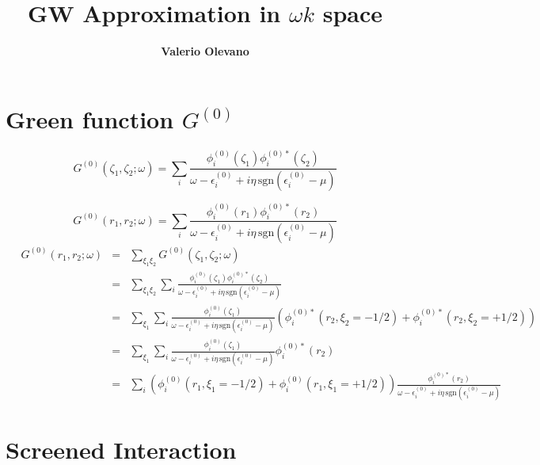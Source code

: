 \documentclass[fleqn]{article}
\title{\bf GW Approximation in $\omega k$ space}
\author{\bf Valerio Olevano}
\begin{document}
\maketitle
\tableofcontents

\newpage

\section{Green function $G^{(0)}$}

\[
  G^{(0)}(\zeta_1,\zeta_2;\omega) = 
  \sum_i \frac{\phi^{(0)}_i(\zeta_1) \phi^{(0)*}_i(\zeta_2)}
  {\omega - \epsilon^{(0)}_i + i \eta \mathrm{\, sgn} \left( \epsilon^{(0)}_i - \mu \right)}
\]

\[
  G^{(0)}(r_1,r_2;\omega) = 
  \sum_i \frac{\phi^{(0)}_i(r_1) \phi^{(0)*}_i(r_2)}
  {\omega - \epsilon^{(0)}_i + i \eta \mathrm{\, sgn} \left( \epsilon^{(0)}_i - \mu \right)}
\]
\begin{eqnarray*}
  \quad
  G^{(0)}(r_1,r_2;\omega) &=&
  \sum_{\xi_1 \xi_2} G^{(0)}(\zeta_1,\zeta_2;\omega) 
  \\ &=& 
  \sum_{\xi_1 \xi_2}    \sum_i \frac{\phi^{(0)}_i(\zeta_1) \phi^{(0)*}_i(\zeta_2)}
  {\omega - \epsilon^{(0)}_i + i \eta \mathrm{\, sgn} \left( \epsilon^{(0)}_i - \mu \right)}
  \\
  &=& \sum_{\xi_1}  \sum_i \frac{\phi^{(0)}_i(\zeta_1)}
  {\omega - \epsilon^{(0)}_i + i \eta \mathrm{\, sgn} \left( \epsilon^{(0)}_i - \mu \right)}
  \left( \phi^{(0)*}_i(r_2,\xi_2=-1/2) + \phi^{(0)*}_i(r_2,\xi_2=+1/2) \right)
  \\
  &=& \sum_{\xi_1}  \sum_i \frac{\phi^{(0)}_i(\zeta_1)}
  {\omega - \epsilon^{(0)}_i + i \eta \mathrm{\, sgn} \left( \epsilon^{(0)}_i - \mu \right)}
  \phi^{(0)*}_i(r_2)
  \\
  &=&  \sum_i \left( \phi^{(0)}_i(r_1,\xi_1=-1/2) + \phi^{(0)}_i(r_1,\xi_1=+1/2) \right)
  \frac{\phi^{(0)*}_i(r_2)}
  {\omega - \epsilon^{(0)}_i + i \eta \mathrm{\, sgn} \left( \epsilon^{(0)}_i - \mu \right)}
\end{eqnarray*}

\newpage

\section{Screened Interaction}
\end{document}
